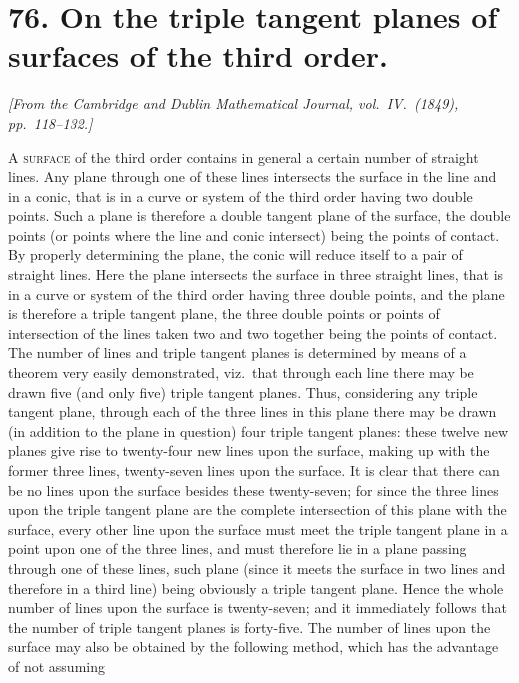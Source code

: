 \documentclass[11pt,a4paper]{article}
\theoremstyle{definition}
\begin{document}
\newpage
\section*{76. On the triple tangent planes of surfaces of the third order.}

\begin{flushright}
\textit{[From the Cambridge and Dublin Mathematical Journal, vol.\ IV.\ (1849), pp.\ 118--132.]}
\end{flushright}

\setcounter{page}{445}

\textsc{A} \textsc{surface} of the third order contains in general a certain number of straight lines. Any plane through one of these lines intersects the surface in the line and in a conic, that is in a curve or system of the third order having two double points. Such a plane is therefore a double tangent plane of the surface, the double points (or points where the line and conic intersect) being the points of contact. By properly determining the plane, the conic will reduce itself to a pair of straight lines. Here the plane intersects the surface in three straight lines, that is in a curve or system of the third order having three double points, and the plane is therefore a triple tangent plane, the three double points or points of intersection of the lines taken two and two together being the points of contact. The number of lines and triple tangent planes is determined by means of a theorem very easily demonstrated, viz.\ that through each line there may be drawn five (and only five) triple tangent planes. Thus, considering any triple tangent plane, through each of the three lines in this plane there may be drawn (in addition to the plane in question) four triple tangent planes: these twelve new planes give rise to twenty-four new lines upon the surface, making up with the former three lines, twenty-seven lines upon the surface. It is clear that there can be no lines upon the surface besides these twenty-seven; for since the three lines upon the triple tangent plane are the complete intersection of this plane with the surface, every other line upon the surface must meet the triple tangent plane in a point upon one of the three lines, and must therefore lie in a plane passing through one of these lines, such plane (since it meets the surface in two lines and therefore in a third line) being obviously a triple tangent plane. Hence the whole number of lines upon the surface is twenty-seven; and it immediately follows that the number of triple tangent planes is forty-five. The number of lines upon the surface may also be obtained by the following method, which has the advantage of not assuming
\end{document}

